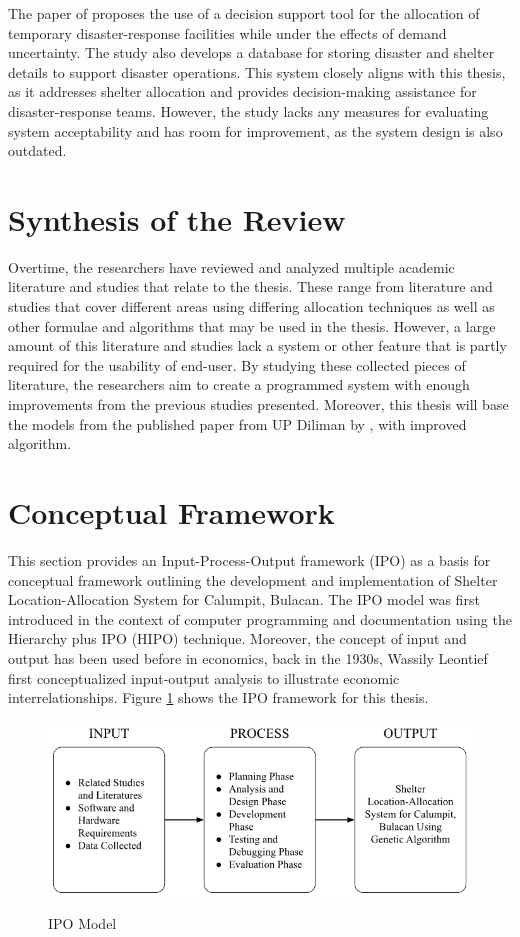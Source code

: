 	 The paper of \textcite{Cavdur2019} proposes the use of a decision support tool for the allocation of temporary disaster-response facilities while under the effects of demand uncertainty. The study also develops a database for storing disaster and shelter details to support disaster operations. This system closely aligns with this thesis, as it addresses shelter allocation and provides decision-making assistance for disaster-response teams. However, the study lacks any measures for evaluating system acceptability and has room for improvement, as the system design is also outdated.

\section{Synthesis of the Review}
	Overtime, the researchers have reviewed and analyzed multiple academic literature and studies that relate to the thesis. These range from literature and studies that cover different areas using differing allocation techniques as well as other formulae and algorithms that may be used in the thesis. However, a large amount of this literature and studies lack a system or other feature that is partly required for the usability of end-user. By studying these collected pieces of literature, the researchers aim to create a programmed system with enough improvements from the previous studies presented. Moreover, this thesis will base the models from the published paper from UP Diliman by \textcite{LeahUP}, with improved algorithm.

\section{Conceptual Framework}
	This section provides an Input-Process-Output framework (IPO) as a basis for conceptual framework outlining the development and implementation of Shelter Location-Allocation System for Calumpit, Bulacan. The IPO model was first introduced in the context of computer programming and documentation using the Hierarchy plus IPO (HIPO) technique. Moreover, the concept of input and output has been used before in economics, back in the 1930s, Wassily Leontief first conceptualized input-output analysis to illustrate economic interrelationships. Figure \ref{IPOModel} shows the IPO framework for this thesis.
	
	 \begin{figure}[h!]
		\centering
		\caption{IPO Model} \label{fig:ipo}
		\includegraphics[width=\linewidth]{IPO}
		\label{IPOModel}
	\end{figure}
	
